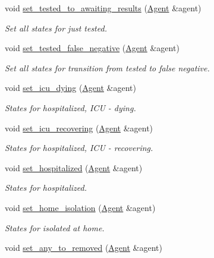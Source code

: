 \begin{DoxyCompactItemize}
void \hyperlink{classRegularStatesManager_a65490a9d9e523ed87acb5b36444ccbba}{set\+\_\+tested\+\_\+to\+\_\+awaiting\+\_\+results} (\hyperlink{classAgent}{Agent} \&agent)
\begin{DoxyCompactList}\small\item\em Set all states for just tested. \end{DoxyCompactList}\item 
void \hyperlink{classRegularStatesManager_a82b160b267cc70b5c599119fd278936d}{set\+\_\+tested\+\_\+false\+\_\+negative} (\hyperlink{classAgent}{Agent} \&agent)
\begin{DoxyCompactList}\small\item\em Set all states for transition from tested to false negative. \end{DoxyCompactList}\item 
void \hyperlink{classRegularStatesManager_af04422e175919ff93d09f19832fc122c}{set\+\_\+icu\+\_\+dying} (\hyperlink{classAgent}{Agent} \&agent)
\begin{DoxyCompactList}\small\item\em States for hospitalized, I\+CU -\/ dying. \end{DoxyCompactList}\item 
void \hyperlink{classRegularStatesManager_a34094d08eb2378f7e02d73da4599fab7}{set\+\_\+icu\+\_\+recovering} (\hyperlink{classAgent}{Agent} \&agent)
\begin{DoxyCompactList}\small\item\em States for hospitalized, I\+CU -\/ recovering. \end{DoxyCompactList}\item 
void \hyperlink{classRegularStatesManager_aba141d47c1bf1e7de90a5d12d6cbcb65}{set\+\_\+hospitalized} (\hyperlink{classAgent}{Agent} \&agent)
\begin{DoxyCompactList}\small\item\em States for hospitalized. \end{DoxyCompactList}\item 
void \hyperlink{classRegularStatesManager_a1be9c0452ba637272cf12ceeec82eda7}{set\+\_\+home\+\_\+isolation} (\hyperlink{classAgent}{Agent} \&agent)
\begin{DoxyCompactList}\small\item\em States for isolated at home. \end{DoxyCompactList}\item 
void \hyperlink{classRegularStatesManager_a3f6d863ccc2712cc6b742369e8903d3f}{set\+\_\+any\+\_\+to\+\_\+removed} (\hyperlink{classAgent}{Agent} \&agent)

\end{DoxyCompactItemize}
